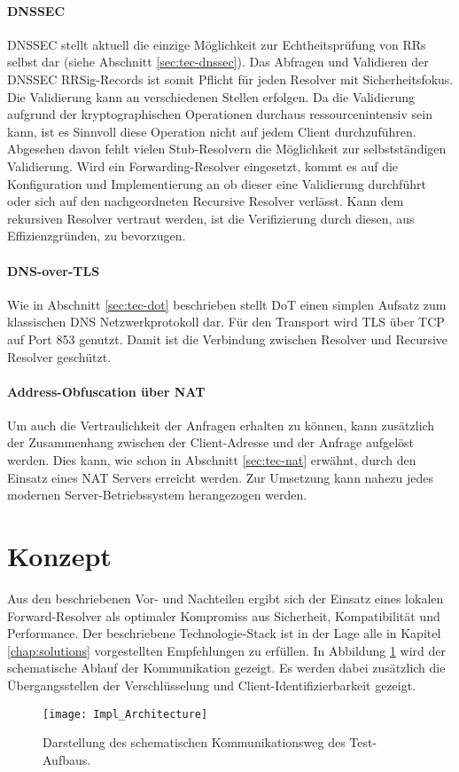 \paragraph{DNSSEC}
DNSSEC stellt aktuell die einzige Möglichkeit zur Echtheitsprüfung von RRs selbst dar (siehe Abschnitt \ref{sec:tec-dnssec}). Das Abfragen und Validieren der \ac{DNSSEC} RRSig-Records ist somit Pflicht für jeden Resolver mit Sicherheitsfokus. Die Validierung kann an verschiedenen Stellen erfolgen. Da die Validierung aufgrund der kryptographischen Operationen durchaus ressourcenintensiv sein kann, ist es Sinnvoll diese Operation nicht auf jedem Client durchzuführen. Abgesehen davon fehlt vielen Stub-Resolvern die Möglichkeit zur selbstständigen Validierung. Wird ein Forwarding-Resolver eingesetzt, kommt es auf die Konfiguration und Implementierung an ob dieser eine Validierung durchführt oder sich auf den nachgeordneten Recursive Resolver verlässt. Kann dem rekursiven Resolver vertraut werden, ist die Verifizierung durch diesen, aus Effizienzgründen, zu bevorzugen.

\paragraph{DNS-over-TLS}
Wie in Abschnitt \ref{sec:tec-dot} beschrieben stellt DoT einen simplen Aufsatz zum klassischen DNS Netzwerkprotokoll dar. Für den Transport wird TLS über TCP auf Port 853 genutzt\cite{rfc7858}. Damit ist die Verbindung zwischen Resolver und Recursive Resolver geschützt. 

\paragraph{Address-Obfuscation über NAT}
Um auch die Vertraulichkeit der Anfragen erhalten zu können, kann zusätzlich der Zusammenhang zwischen der Client-Adresse und der Anfrage aufgelöst werden. Dies kann, wie schon in Abschnitt \ref{sec:tec-nat} erwähnt, durch den Einsatz eines NAT Servers erreicht werden. Zur Umsetzung kann nahezu jedes modernen Server-Betriebssystem herangezogen werden.

\section{Konzept}
Aus den beschriebenen Vor- und Nachteilen ergibt sich der Einsatz eines lokalen Forward-Resolver als optimaler Kompromiss aus Sicherheit, Kompatibilität und Performance. Der beschriebene Technologie-Stack ist in der Lage alle in Kapitel \ref{chap:solutions} vorgestellten Empfehlungen zu erfüllen. In Abbildung \ref{img:impl-architecture} wird der schematische Ablauf der Kommunikation gezeigt. Es werden dabei zusätzlich die Übergangsstellen der Verschlüsselung und Client-Identifizierbarkeit gezeigt.
\begin{figure}[hb]
    \centering
    \texttt{[image: Impl\_Architecture]}
    \caption{Darstellung des schematischen Kommunikationsweg des Test-Aufbaus.}
    \label{img:impl-architecture}
\end{figure}

